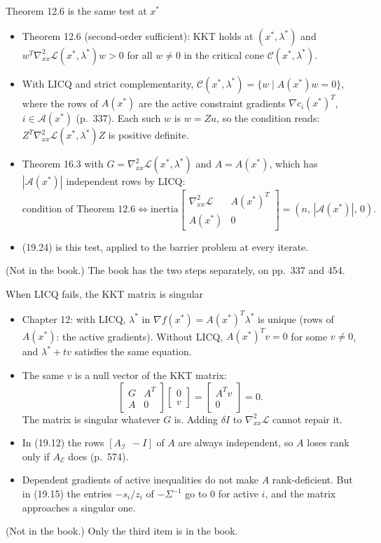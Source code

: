 \documentclass[aspectratio=169,12pt]{beamer}
\newcommand{\xs}{x^{*}}
\newcommand{\gradf}{\nabla f}
\newcommand{\notinbook}{{\small(Not in the book.)}}
\newcommand{\cA}{\mathcal{A}}
\newcommand{\cC}{\mathcal{C}}
\newcommand{\cE}{\mathcal{E}}
\newcommand{\cI}{\mathcal{I}}
\newcommand{\cL}{\mathcal{L}}
\newcommand{\hessL}{\nabla_{xx}^{2}\cL}
\newcommand{\Ae}{A_{\cE}}
\newcommand{\Ai}{A_{\cI}}
\begin{document}
\begin{frame}{Theorem 12.6 is the same test at $\xs$}
  \begin{itemize}\setlength\itemsep{0.3em}
    \item Theorem 12.6 (second-order sufficient): KKT holds at $(\xs,\lambda^{*})$ and
      $w^{T}\hessL(\xs,\lambda^{*})w>0$ for all $w\ne 0$ in the critical cone $\cC(\xs,\lambda^{*})$.
    \item With LICQ and strict complementarity, $\cC(\xs,\lambda^{*})=\{w\mid A(\xs)w=0\}$, where the rows of
      $A(\xs)$ are the active constraint gradients $\nabla c_{i}(\xs)^{T}$, $i\in\cA(\xs)$ (p.~337).
      Each such $w$ is $w=Zu$, so the condition reads: $Z^{T}\hessL(\xs,\lambda^{*})Z$ is positive definite.
    \item Theorem 16.3 with $G=\hessL(\xs,\lambda^{*})$ and $A=A(\xs)$, which has $|\cA(\xs)|$ independent rows by LICQ:
      \[ \text{condition of Theorem 12.6}\iff
         \mathrm{inertia}\begin{bmatrix}\hessL & A(\xs)^{T}\\ A(\xs) & 0\end{bmatrix}=(n,\,|\cA(\xs)|,\,0). \]
    \item (19.24) is this test, applied to the barrier problem at every iterate.
  \end{itemize}
  \notinbook{} The book has the two steps separately, on pp.~337 and 454.
\end{frame}

\begin{frame}{When LICQ fails, the KKT matrix is singular}
  \begin{itemize}\setlength\itemsep{0.15em}
    \item Chapter 12: with LICQ, $\lambda^{*}$ in $\gradf(\xs)=A(\xs)^{T}\lambda^{*}$ is unique (rows of $A(\xs)$: the active
      gradients). Without LICQ, $A(\xs)^{T}v=0$ for some $v\ne 0$, and $\lambda^{*}+tv$ satisfies the same equation.
    \item The same $v$ is a null vector of the KKT matrix:
      \[ \begin{bmatrix} G & A^{T}\\ A & 0\end{bmatrix}\begin{bmatrix} 0\\ v\end{bmatrix}
         =\begin{bmatrix} A^{T}v\\ 0\end{bmatrix}=0 . \]
      The matrix is singular whatever $G$ is. Adding $\delta I$ to $\hessL$ cannot repair it.
    \item In (19.12) the rows $[\Ai\ \ -I]$ of $A$ are always independent, so $A$ loses rank only if $\Ae$ does (p.~574).
    \item Dependent gradients of active inequalities do not make $A$ rank-deficient. But in (19.15)
      the entries $-s_{i}/z_{i}$ of $-\Sigma^{-1}$ go to $0$ for active $i$, and the matrix approaches a singular one.
  \end{itemize}
  \notinbook{} Only the third item is in the book.
\end{frame}
\end{document}
